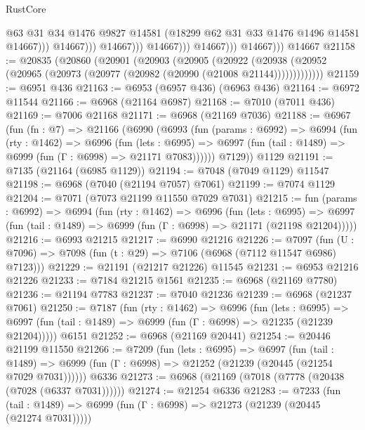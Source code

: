 \begin{lexlean}{RustCore}
\begin{coremodule}
                                      @63
                                      @31
                                      @34
                                      @1476
                                      @9827
                                      @14581
                                      (@18299 @62 @31 @33 @1476 @1496 @14581 @14667)))
                                  @14667)))
                            @14667)))
                      @14667)))
                @14667)))
          @14667)))
    @14667
@21158 := @20835
    (@20860
      (@20901
        (@20903
          (@20905
            (@20922
              (@20938 (@20952 (@20965 (@20973 (@20977 (@20982 (@20990 (@21008 @21144)))))))))))))
@21159 := @6951 @436
@21163 := @6953 (@6957 @436) (@6963 @436)
@21164 := @6972 @11544
@21166 := @6968 (@21164 @6987)
@21168 := @7010 (@7011 @436)
@21169 := @7006 @21168
@21171 := @6968 (@21169 @7036)
@21188 := @6967
    (fun (fn : @7) =>
    @21166
      (@6990
        (@6993
          (fun (params : @6992) =>
          @6994
            (fun (rty : @1462) =>
            @6996
              (fun (lets : @6995) =>
              @6997 (fun (tail : @1489) => @6999 (fun (Γ : @6998) => @21171 @7083))))))
        @7129))
    @1129
@21191 := @7135 (@21164 (@6985 @1129))
@21194 := @7048 (@7049 @1129) @11547
@21198 := @6968 (@7040 (@21194 @7057) @7061)
@21199 := @7074 @1129
@21204 := @7071 (@7073 @21199 @11550 @7029 @7031)
@21215 := fun (params : @6992) =>
  @6994
    (fun (rty : @1462) =>
    @6996
      (fun (lets : @6995) =>
      @6997 (fun (tail : @1489) => @6999 (fun (Γ : @6998) => @21171 (@21198 @21204)))))
@21216 := @6993 @21215
@21217 := @6990 @21216
@21226 := @7097
    (fun (U : @7096) => @7098 (fun (t : @29) => @7106 (@6968 (@7112 @11547 @6986) @7123)))
@21229 := @21191 (@21217 @21226) @11545
@21231 := @6953 @21216 @21226
@21233 := @7184 @21215 @1561
@21235 := @6968 (@21169 @7780)
@21236 := @21194 @7783
@21237 := @7040 @21236
@21239 := @6968 (@21237 @7061)
@21250 := @7187
    (fun (rty : @1462) =>
    @6996
      (fun (lets : @6995) =>
      @6997 (fun (tail : @1489) => @6999 (fun (Γ : @6998) => @21235 (@21239 @21204)))))
    @6151
@21252 := @6968 (@21169 @20441)
@21254 := @20446 @21199 @11550
@21266 := @7209
    (fun (lets : @6995) =>
    @6997
      (fun (tail : @1489) =>
      @6999 (fun (Γ : @6998) => @21252 (@21239 (@20445 (@21254 @7029 @7031))))))
    @6336
@21273 := @6968 (@21169 (@7018 (@7778 (@20438 (@7028 (@6337 @7031))))))
@21274 := @21254 @6336
@21283 := @7233
    (fun (tail : @1489) => @6999 (fun (Γ : @6998) => @21273 (@21239 (@20445 (@21274 @7031)))))

\end{coremodule}
\end{lexlean}
